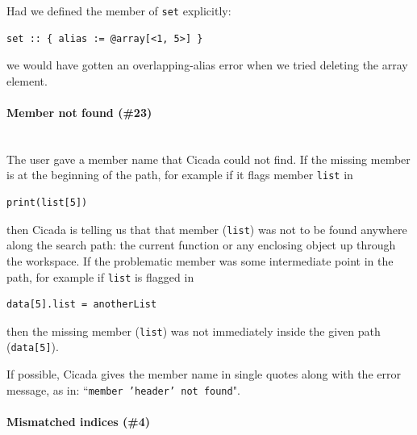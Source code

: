 \documentclass{article}
\newenvironment{code}{
       \begin{list}{}{
               \setlength{\leftmargin}{.4in}
               \setlength{\rightmargin}{0in}
               \setlength{\topsep}{.2in}
       }
       \small
       \item[] }
       { \end{list}   }
\begin{document}
\noindent Had we defined the member of \verb#set# explicitly:

\begin{code} \begin{verbatim}
set :: { alias := @array[<1, 5>] }
\end{verbatim} \end{code}

\noindent we would have gotten an overlapping-alias error when we tried deleting the array element.\\




\paragraph{Member not found (\#23)\\\\}

The user gave a member name that Cicada could not find.  If the missing member is at the beginning of the path, for example if it flags member \verb#list# in

\begin{code} \begin{verbatim}
print(list[5])
\end{verbatim} \end{code}

\noindent then Cicada is telling us that that member (\verb#list#) was not to be found anywhere along the search path:  the current function or any enclosing object up through the workspace.  If the problematic member was some intermediate point in the path, for example if \verb#list# is flagged in

\begin{code} \begin{verbatim}
data[5].list = anotherList
\end{verbatim} \end{code}

\noindent then the missing member (\verb#list#) was not immediately inside the given path (\verb#data[5]#).

If possible, Cicada gives the member name in single quotes along with the error message, as in:  ``\texttt{member 'header' not found}".\\




\paragraph{Mismatched indices (\#4)\\\\}
\end{document}
